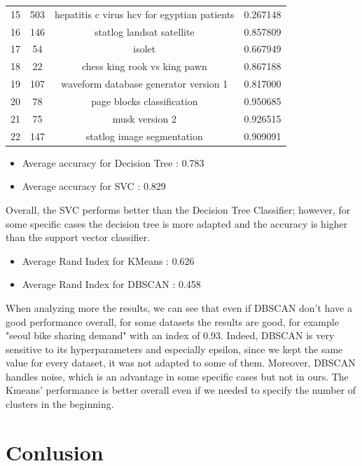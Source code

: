 \documentclass[10pt, a4paper]{article}
\begin{document}
\begin{tabular}{cccc}
15   &     503   &    hepatitis c virus hcv for egyptian patients & 0.267148 \\
16   &     146   &                      statlog landsat satellite & 0.857809 \\
17   &      54   &                                         isolet & 0.667949 \\
18   &      22   &                   chess king rook vs king pawn & 0.867188 \\
19   &     107   &          waveform database generator version 1 & 0.817000 \\
20   &      78   &                     page blocks classification & 0.950685 \\
21   &      75   &                                 musk version 2 & 0.926515 \\
22   &     147   &                     statlog image segmentation & 0.909091 \\
\end{tabular}


\begin{itemize}
    \item Average accuracy for Decision Tree : 0.783
    \item Average accuracy for SVC : 0.829
\end{itemize}


Overall, the SVC performs better than the Decision Tree Classifier; however, for some specific cases the decision tree is more adapted and the accuracy is higher than the support vector classifier. 

\begin{itemize}
    \item Average Rand Index for KMeans : 0.626
    \item Average Rand Index for DBSCAN : 0.458
\end{itemize}


When analyzing more the results, we can see that even if DBSCAN don't have a good performance overall, for some datasets the results are good, for example "seoul bike sharing demand" with an index of 0.93. Indeed, DBSCAN is very sensitive to its hyperparameters and especially epsilon, since we kept the same value for every dataset, it was not adapted to some of them. Moreover, DBSCAN handles noise, which is an advantage in some specific cases but not in ours. The Kmeans' performance is better overall even if we needed to specify the number of clusters in the beginning.

\newpage
\section{Conlusion}
%
\end{document}
